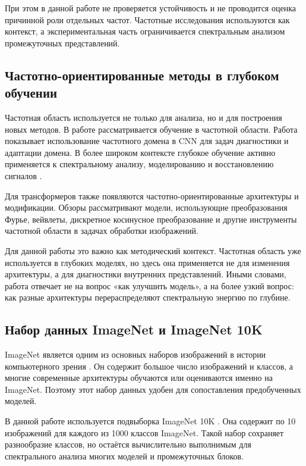 При этом в данной работе не проверяется устойчивость и не проводится оценка причинной роли отдельных частот. Частотные исследования используются как контекст, а экспериментальная часть ограничивается спектральным анализом промежуточных представлений.

\subsection{Частотно-ориентированные методы в глубоком обучении}

Частотная область используется не только для анализа, но и для построения новых методов. В работе \cite{xu2020learning} рассматривается обучение в частотной области. Работа \cite{li2021frequency} показывает использование частотного домена в CNN для задач диагностики и адаптации домена. В более широком контексте глубокое обучение активно применяется к спектральному анализу, моделированию и восстановлению сигналов \cite{liu2024deep}.

Для трансформеров также появляются частотно-ориентированные архитектуры и модификации. Обзоры \cite{aslan2026frequency,li2025review} рассматривают модели, использующие преобразования Фурье, вейвлеты, дискретное косинусное преобразование и другие инструменты частотной области в задачах обработки изображений.

Для данной работы это важно как методический контекст. Частотная область уже используется в глубоких моделях, но здесь она применяется не для изменения архитектуры, а для диагностики внутренних представлений. Иными словами, работа отвечает не на вопрос «как улучшить модель», а на более узкий вопрос: как разные архитектуры перераспределяют спектральную энергию по глубине.

\subsection{Набор данных ImageNet и ImageNet 10K}

ImageNet является одним из основных наборов изображений в истории компьютерного зрения \cite{deng2009imagenet}. Он содержит большое число изображений и классов, а многие современные архитектуры обучаются или оцениваются именно на ImageNet. Поэтому этот набор данных удобен для сопоставления предобученных моделей.

В данной работе используется подвыборка ImageNet 10K \cite{priyerana_imagenet10k}. Она содержит по 10 изображений для каждого из 1000 классов ImageNet. Такой набор сохраняет разнообразие классов, но остаётся вычислительно выполнимым для спектрального анализа многих моделей и промежуточных блоков.


